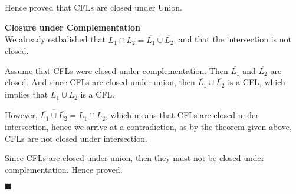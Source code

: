 \documentclass[a4paper]{exam}
\begin{document}
\begin{questions}
\begin{solution}

	Hence proved that CFLs are closed under Union.

	\textbf{Closure under Complementation} \\
	We already estbalished that $ L_1 \cap L_2 = \overline{\overline{L_1} \cup \overline{L_2}}$, and that the intersection is not closed.
	
	Assume that CFLs were closed under complementation. Then $ \overline{L_1} $ and $ \overline{L_2} $ are closed. And since CFLs are closed under union, then $ \overline{L_1} \cup \overline{L_2} $ is a CFL, which implies that $ \overline{\overline{L_1} \cup \overline{L_2}} $ is a CFL. 
	
	However, $ \overline{\overline{L_1} \cup \overline{L_2}} = L_1 \cap L_2 $, which means that CFLs are closed under intersection, hence we arrive at a contradiction, as by the theorem given above, CFLs are not closed under intersection. 

	Since CFLs are closed under union, then they must not be closed under complementation. Hence proved.
	\begin{flushright}
		$ \blacksquare $
	\end{flushright}
\end{solution}

\end{questions}
\end{document}
